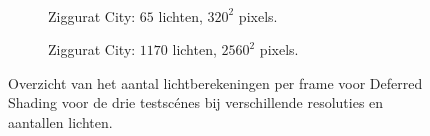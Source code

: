 \begin{figure}[t]
\begin{adjustbox}{minipage=\textwidth, scale=0.55}
\begin{subfigure}[b]{0.8\textwidth}
      \label{fig:ts-lc-frames-deferred:alley-high}
    \end{subfigure}
  \end{adjustbox} \\
  \begin{adjustbox}{minipage=\textwidth, scale=0.55}
    \begin{subfigure}[b]{0.8\textwidth}
      \centering
      \def\svgwidth{\textwidth}
      
      \caption{Ziggurat City: $65$ lichten, $320^2$ pixels.}
      \label{fig:ts-lc-frames-deferred:city-low}
    \end{subfigure}
  \end{adjustbox}\hspace{-0.075\textwidth}  %
  \begin{adjustbox}{minipage=\textwidth, scale=0.55}
    \begin{subfigure}[b]{0.8\textwidth}
      \centering
      \def\svgwidth{\textwidth}
      
      \caption{Ziggurat City: $1170$ lichten, $2560^2$ pixels.}
      \label{fig:ts-lc-frames-deferred:city-high}
    \end{subfigure}
  \end{adjustbox}
  \caption{Overzicht van het aantal lichtberekeningen per frame voor Deferred Shading
           voor de drie testsc\'enes bij verschillende resoluties en aantallen
           lichten.}
  \label{fig:ts-lc-frames-deferred}
\end{figure}

